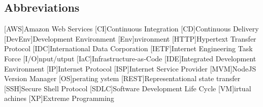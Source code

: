 \newcommand{\abbr}{Abbreviations}
\subsection{Abbreviations}

\begin{acronym}[1234567890]		%
\setlength{\itemsep}{-\parsep}	%
[AWS]{Amazon Web Services}
[CI]{Continuous Integration}
[CD]{Continuous Delivery}
[DevEnv]{Development Environment}
[Env]{nvironment}
[HTTP]{Hypertext Transfer Protocol}
[IDC]{International Data Corporation}
[IETF]{Internet Engineering Task Force}
[I/O]{nput/utput}
[IaC]{Infrastructure-as-Code}
[IDE]{Integrated Development Environment }
[IP]{Internet Protocol}
[ISP]{Internet Service Provider}
[MVM]{NodeJS Version Manager}
[OS]{perating ystem}
[REST]{Representational state transfer}
[SSH]{Secure Shell Protocol}
[SDLC]{Software Development Life Cycle}
[VM]{irtual achines}
[XP]{Extreme Programming}
\end{acronym}